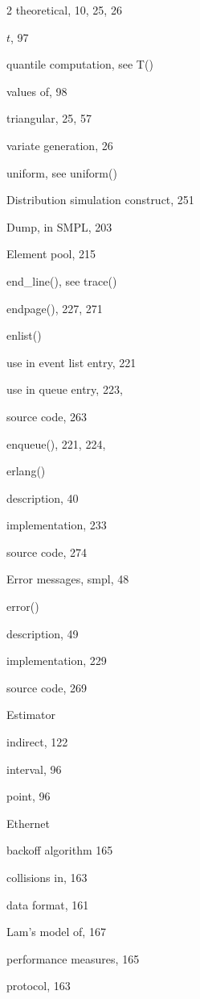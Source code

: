 \begin{multicols}{2}
\qquad theoretical, 10, 25, 26\par
\quad $t$, 97\par
\qquad quantile computation, see T()\par
\qquad values of, 98\par
\quad triangular, 25, 57\par
\qquad variate generation, 26\par
\quad uniform, see uniform()\par
\noindent Distribution simulation construct, 251\par
\noindent Dump, in SMPL, 203\par
\noindent Element pool, 215\par
\noindent end\_line(), see trace()\par
\noindent endpage(), 227, 271\par
\columnbreak
\noindent enlist()\par
\quad use in event list entry, 221\par
\quad use in queue entry, 223,\par
\quad source code, 263\par
\noindent enqueue(), 221, 224,\par
\noindent erlang()\par
\quad description, 40\par
\quad implementation, 233\par
\quad source code, 274\par
\noindent Error messages, smpl, 48\par
\noindent error()\par
\quad description, 49\par
\quad implementation, 229\par
\quad source code, 269\par
\noindent Estimator\par
\quad indirect, 122\par
\quad interval, 96\par
\quad point, 96\par
\noindent Ethernet\par
\quad backoff algorithm 165\par
\quad collisions in, 163\par
\quad data format, 161\par
\quad Lam's model of, 167\par
\quad performance measures, 165\par
\quad protocol, 163\par

\end{multicols}
